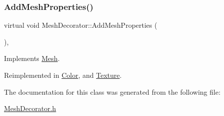 \subsubsection{\texorpdfstring{AddMeshProperties()}{AddMeshProperties()}}
{\footnotesize\ttfamily virtual void Mesh\+Decorator\+::\+Add\+Mesh\+Properties (\begin{DoxyParamCaption}{ }\end{DoxyParamCaption})\hspace{0.3cm}{\ttfamily [inline]}, {\ttfamily [virtual]}}



Implements \mbox{\hyperlink{class_mesh_a4369b541f608d9a812da80f4d7b13661}{Mesh}}.



Reimplemented in \mbox{\hyperlink{class_color_abd3f6be3b5babb28bf1a13c89219bd4b}{Color}}, and \mbox{\hyperlink{class_texture_aa7e2f179b2117c32e03e38fdc0f85290}{Texture}}.



The documentation for this class was generated from the following file\+:\begin{DoxyCompactItemize}
\item 
\mbox{\hyperlink{_mesh_decorator_8h}{Mesh\+Decorator.\+h}}\end{DoxyCompactItemize}
